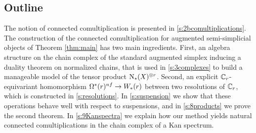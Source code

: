 \subsection*{Outline}

The notion of connected comultiplication is presented in \cref{s:2bcomultiplications}.
The construction of the connected comultiplication for augmented semi-simplicial objects of Theorem \ref{thm:main} has two main ingredients.
First, an algebra structure on the chain complex of the standard augmented simplex inducing a duality theorem on normalized chains, that is used in \cref{s:3complexes} to build a manageable model of the tensor product $\operatorname{N}_*(X)^{\otimes r}$.
Second, an explicit $\mathbb{C}_r$-equivariant homomorphism $\Omega^*(r)^{nf}\to W_*(r)$ between two resolutions of $\mathbb{C}_r$, which is constructed in \cref{s:resolutions}.
In \cref{s:suspension} we show that these operations behave well with respect to suspensions, and in \cref{s:8products} we prove the second theorem.
In \cref{s:9Kanspectra} we explain how our method yields natural connected comultiplications in the chain complex of a Kan spectrum.